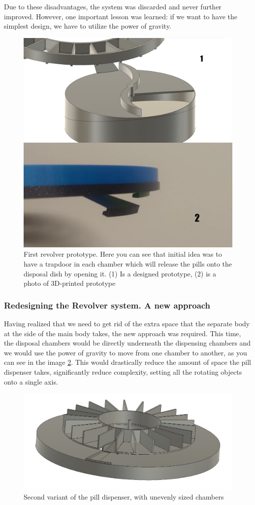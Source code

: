 Due to these disadvantages, the system was discarded and never further improved. However, one important lesson was learned: if we want to have the simplest design, we have to utilize the power of gravity.
\begin{figure}[h]
	\centering
	\includegraphics[width=0.7\linewidth]{Figures/Untitled-2}
	\caption[First revolver prototype]{First revolver prototype. Here you can see that initial idea was to have a trapdoor in each chamber which will release the pills onto the disposal dish by opening it. (1) Is a designed prototype, (2) is a photo of 3D-printed prototype}
	\label{fig:screenshot1}
\end{figure}
\newpage
\subsubsection{Redesigning the Revolver system. A new approach}
Having realized that we need to get rid of the extra space that the separate body at the side of the main body takes, the new approach was required. This time, the disposal chambers would be directly underneath the dispensing chambers and we would use the power of gravity to move from one chamber to another, as you can see in the image \ref{fig:pspd2}. This would drastically reduce the amount of space the pill dispenser takes, significantly reduce complexity, setting all the rotating objects onto a single axis.


\begin{figure}[h]
	\centering
	\includegraphics[width=0.7\linewidth]{Figures/PSPD2}
	\caption[2 Variant of the pill dispenser.]{Second variant of the pill dispenser, with unevenly sized chambers}
	\label{fig:pspd2}
\end{figure}

